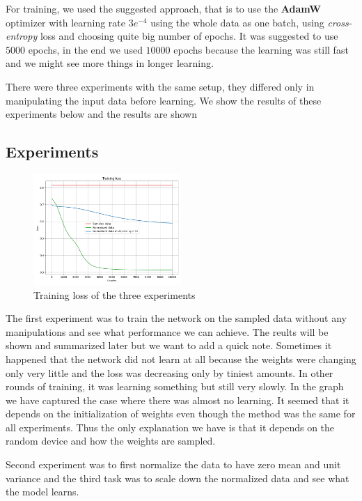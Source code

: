 \documentclass[a4paper,11pt]{article}
\begin{document}
For training, we used the suggested approach, that is to use the \textbf{AdamW} optimizer with learning rate $3e^{-4}$ using the whole data as one batch, using \textit{cross-entropy} loss and choosing quite big number of epochs.
It was suggested to use $5000$ epochs, in the end we used $10000$ epochs because the learning was still fast and we might see more things in longer learning.

There were three experiments with the same setup, they differed only in manipulating the input data before learning.
We show the results of these experiments below and the results are shown

\subsection{Experiments}

\begin{figure}[ht]
    \centering
    \includegraphics[width=0.5\textwidth]{../out/02_shallow/training_loss.png}
    \caption{Training loss of the three experiments}
    \label{fig:training_loss}
\end{figure}

The first experiment was to train the network on the sampled data without any manipulations and see what performance we can achieve.
The reults will be shown and summarized later but we want to add a quick note.
Sometimes it happened that the network did not learn at all because the weights were changing only very little and the loss was decreasing only by tiniest amounts.
In other rounds of training, it was learning something but still very slowly.
In the graph we have captured the case where there was almost no learning.
It seemed that it depends on the initialization of weights even though the method was the same for all experiments.
Thus the only explanation we have is that it depends on the random device and how the weights are sampled.

Second experiment was to first normalize the data to have zero mean and unit variance and the third task was to scale down the normalized data and see what the model learns.
\end{document}
